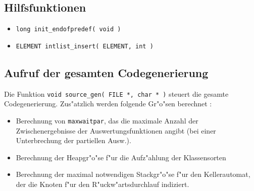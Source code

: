 \subsection{Hilfsfunktionen}

\begin{itemize}
\item {\tt long  init\_endofpredef( void )}

\item {\tt ELEMENT intlist\_insert( ELEMENT, int )}
\end{itemize}

\subsection{Aufruf der gesamten Codegenerierung}

Die Funktion {\tt void  source\_gen( FILE *, char * )}
steuert die gesamte Codegenerierung.
Zus"atzlich werden folgende Gr"o"sen berechnet :

\begin{itemize}
\item Berechnung von {\tt maxwaitpar}, das die maximale Anzahl der Zwischenergebnisse
der Auswertungsfunktionen angibt (bei einer Unterbrechung der partiellen Ausw.).

\item Berechnung der Heapgr"o"se f"ur die Aufz"ahlung der Klassensorten
\item Berechnung der maximal notwendigen Stackgr"o"se f"ur den Kellerautomat, der
die Knoten f"ur den R"uckw"artsdurchlauf indiziert.
\end{itemize}




